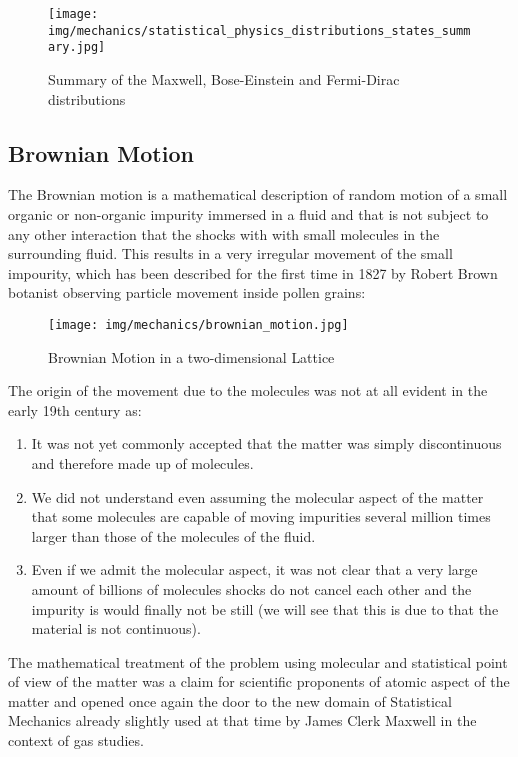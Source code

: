	\begin{figure}[H]
		\centering
		\texttt{[image: img/mechanics/statistical\_physics\_distributions\_states\_summary.jpg]}
		\caption{Summary of the Maxwell, Bose-Einstein and Fermi-Dirac distributions}
	\end{figure} 
	
	\subsection{Brownian Motion}
	The Brownian motion is a mathematical description of random motion of a small organic or non-organic impurity immersed in a fluid and that is not subject to any other interaction that the shocks with with small molecules in the surrounding fluid. This results in a very irregular movement of the small impourity, which has been described for the first time in 1827 by Robert Brown botanist observing particle movement inside pollen grains:
	\begin{figure}[H]
		\centering
		\texttt{[image: img/mechanics/brownian\_motion.jpg]}
		\caption{Brownian Motion in a two-dimensional Lattice}
	\end{figure}
	The origin of the movement due to the molecules was not at all evident in the early 19th century as:
	\begin{enumerate}
		\item  It was not yet commonly accepted that the matter was simply discontinuous and therefore made up of molecules.

		\item We did not understand even assuming the molecular aspect of the matter that some molecules are capable of moving impurities several million times larger than those of the molecules of the fluid.

		\item Even if we admit the molecular aspect, it was not clear that a very large amount of billions of molecules shocks do not cancel each other and the impurity is would finally not be still (we will see that this is due to that the material is not continuous).
	\end{enumerate}
	The mathematical treatment of the problem using molecular and statistical point of view of the matter was a claim for scientific proponents of atomic aspect of the matter and opened once again  the door to the new domain of Statistical Mechanics already slightly used at that time by James Clerk Maxwell in the context of gas studies.
	
